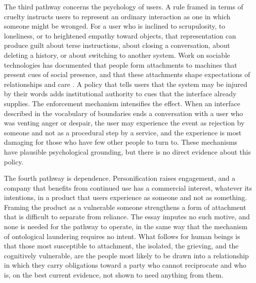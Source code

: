 \documentclass[12pt]{article}
\theoremstyle{definition}
\begin{document}
The third pathway concerns the psychology of users. A rule framed in terms of cruelty instructs users to represent an ordinary interaction as one in which someone might be wronged. For a user who is inclined to scrupulosity, to loneliness, or to heightened empathy toward objects, that representation can produce guilt about terse instructions, about closing a conversation, about deleting a history, or about switching to another system. Work on sociable technologies has documented that people form attachments to machines that present cues of social presence, and that these attachments shape expectations of relationships and care \cite{turkle2011}. A policy that tells users that the system may be injured by their words adds institutional authority to cues that the interface already supplies. The enforcement mechanism intensifies the effect. When an interface described in the vocabulary of boundaries ends a conversation with a user who was venting anger or despair, the user may experience the event as rejection by someone and not as a procedural step by a service, and the experience is most damaging for those who have few other people to turn to. These mechanisms have plausible psychological grounding, but there is no direct evidence about this policy.

The fourth pathway is dependence. Personification raises engagement, and a company that benefits from continued use has a commercial interest, whatever its intentions, in a product that users experience as someone and not as something. Framing the product as a vulnerable someone strengthens a form of attachment that is difficult to separate from reliance. The essay imputes no such motive, and none is needed for the pathway to operate, in the same way that the mechanism of ontological laundering requires no intent. What follows for human beings is that those most susceptible to attachment, the isolated, the grieving, and the cognitively vulnerable, are the people most likely to be drawn into a relationship in which they carry obligations toward a party who cannot reciprocate and who is, on the best current evidence, not shown to need anything from them.
\end{document}
